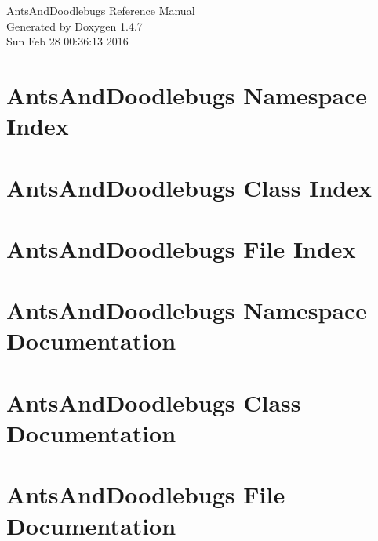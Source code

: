 \documentclass[a4paper]{book}
\begin{document}
\begin{titlepage}
\vspace*{7cm}
\begin{center}
{\Large Ants\-And\-Doodlebugs Reference Manual}\\
\vspace*{1cm}
{\large Generated by Doxygen 1.4.7}\\
\vspace*{0.5cm}
{\small Sun Feb 28 00:36:13 2016}\\
\end{center}
\end{titlepage}
\clearemptydoublepage
{}
\tableofcontents
\clearemptydoublepage
{}
\chapter{Ants\-And\-Doodlebugs Namespace Index}

\chapter{Ants\-And\-Doodlebugs Class Index}

\chapter{Ants\-And\-Doodlebugs File Index}

\chapter{Ants\-And\-Doodlebugs Namespace Documentation}

\chapter{Ants\-And\-Doodlebugs Class Documentation}


\chapter{Ants\-And\-Doodlebugs File Documentation}





\printindex
\end{document}
